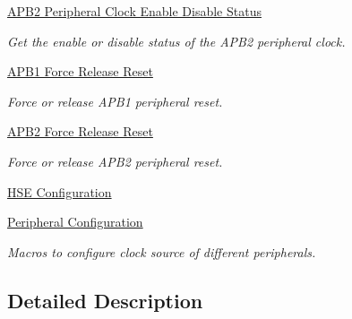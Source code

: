 \begin{DoxyCompactItemize}
\hyperlink{group___r_c_c_ex___a_p_b2___peripheral___clock___enable___disable___status}{A\+P\+B2 Peripheral Clock Enable Disable Status}
\begin{DoxyCompactList}\small\item\em Get the enable or disable status of the A\+P\+B2 peripheral clock. \end{DoxyCompactList}\item 
\hyperlink{group___r_c_c_ex___a_p_b1___force___release___reset}{A\+P\+B1 Force Release Reset}
\begin{DoxyCompactList}\small\item\em Force or release A\+P\+B1 peripheral reset. \end{DoxyCompactList}\item 
\hyperlink{group___r_c_c_ex___a_p_b2___force___release___reset}{A\+P\+B2 Force Release Reset}
\begin{DoxyCompactList}\small\item\em Force or release A\+P\+B2 peripheral reset. \end{DoxyCompactList}\item 
\hyperlink{group___r_c_c_ex___h_s_e___configuration}{H\+S\+E Configuration}
\item 
\hyperlink{group___r_c_c_ex___peripheral___configuration}{Peripheral Configuration}
\begin{DoxyCompactList}\small\item\em Macros to configure clock source of different peripherals. \end{DoxyCompactList}\end{DoxyCompactItemize}


\subsection{Detailed Description}
